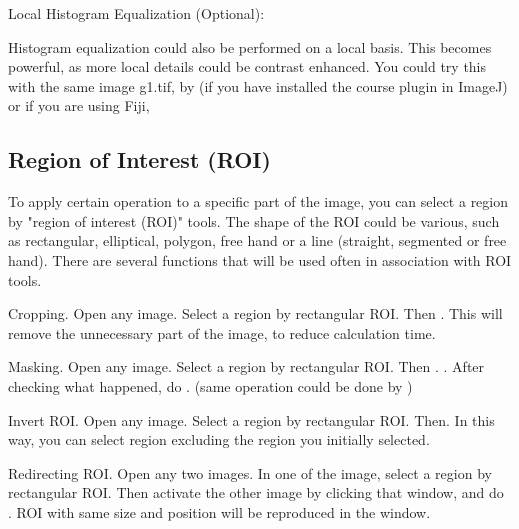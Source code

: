 \begin{indentexercise}{3}
Local Histogram Equalization (Optional):
\item Histogram equalization could also be performed on a local basis. This becomes
powerful, as more local details could be contrast enhanced. You could
try this with the same image g1.tif, by  
(if you have installed the course plugin in ImageJ) or if you are using Fiji, 
\end{indentexercise}



\subsection{Region of Interest (ROI) }
\label{subsec:roi}
To apply certain operation to a specific part of the image, you can
select a region by "region of interest
(ROI)" tools. The shape of the ROI could be various,
such as rectangular, elliptical, polygon, free hand or a line
(straight, segmented or free hand). There are several functions that
will be used often in association with ROI tools. 

\begin{indentexercise}{1}
Cropping. Open any image. Select a region by
rectangular ROI. Then . This will
remove the unnecessary part of the image, to reduce calculation time.
\end{indentexercise}

\begin{indentexercise}{2}
Masking. Open any image. Select a region by
rectangular ROI. Then .
. After checking what
happened, do . (same operation could
be done by )
\end{indentexercise}

\begin{indentexercise}{3}
Invert ROI. Open any image. Select a region by
rectangular ROI. Then. In this way, you can select region
excluding the region you initially selected.
\end{indentexercise}

\begin{indentexercise}{4}
Redirecting ROI. Open any two images. In one
of the image, select a region by rectangular ROI. Then activate the
other image by clicking that window, and do . ROI with
same size and position will be reproduced in the window. 
\end{indentexercise}



